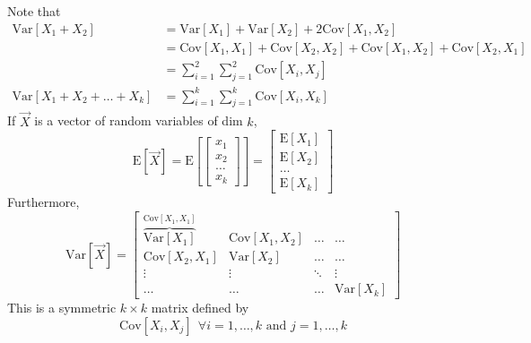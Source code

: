 \documentclass[12pt]{article}
\newcommand{\expected}[1]{\mathrm{E}[#1]}
\newcommand{\variance}[1]{\mathrm{Var}[#1]}
\newcommand{\covariance}[1]{\mathrm{Cov}[#1]}
\begin{document}
Note that 
$$\begin{aligned} \variance{X_1 + X_2} &= \variance{X_1} + \variance{X_2} + 2\covariance{X_1, X_2} \\ &= \covariance{X_1, X_1} + \covariance{X_2, X_2} + \covariance{X_1, X_2} + \covariance{X_2, X_1} \\ &= \sum_{i = 1}^2 \sum_{j = 1}^2 \covariance{X_i, X_j} \\ \variance{X_1 + X_2 + \dots + X_k} &= \sum_{i = 1}^k \sum_{j = 1}^k \covariance{X_i, X_k} \end{aligned} $$ 
If $\vec{X}$ is a vector of random variables of dim $k$, 
$$ \expected{\vec{X}} = \expected{\begin{bmatrix} x_1 \\ x_2 \\ \hdots \\ x_k \end{bmatrix}} = \begin{bmatrix} \expected{X_1} \\ \expected{X_2} \\ \hdots \\ \expected{X_k} \end{bmatrix} $$ Furthermore, $$\variance{\vec{X}} = \begin{bmatrix} \overbrace{\variance{X_1}}^{\covariance{X_1, X_1}} & \covariance{X_1, X_2} & \ldots & \ldots \\ \covariance{X_2, X_1} & \variance{X_2} & \ldots & \ldots \\ \vdots & \vdots & \ddots & \vdots \\ \ldots & \ldots & \ldots & \variance{X_k} \end{bmatrix} $$ 
This is a symmetric $k \times k$ matrix defined by $$ \covariance{X_i, X_j} ~~\forall i = 1, \dots, k \text{ and } j = 1, \dots, k $$ 
\end{document}
